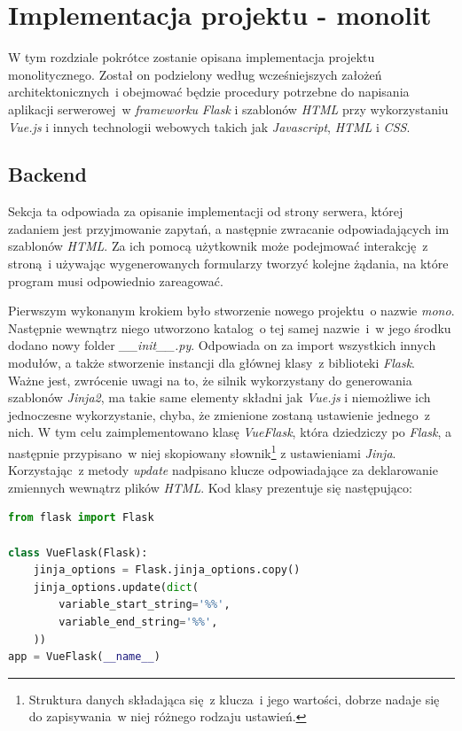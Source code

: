 \chapter{Implementacja projektu - monolit}
\label{roz4}
W tym rozdziale pokrótce zostanie opisana implementacja projektu monolitycznego. Został on podzielony według wcześniejszych założeń architektonicznych~i obejmować będzie procedury potrzebne do napisania aplikacji serwerowej~w \textit{frameworku} \textit{Flask} i szablonów \textit{HTML} przy wykorzystaniu \textit{Vue.js} i innych technologii webowych takich jak \textit{Javascript}, \textit{HTML} i \textit{CSS}.
\section{Backend}
Sekcja ta odpowiada za opisanie implementacji od strony serwera, której zadaniem jest przyjmowanie zapytań, a następnie zwracanie odpowiadających im szablonów \textit{HTML}. Za ich pomocą użytkownik może podejmować interakcję~z stroną~i używając wygenerowanych formularzy tworzyć kolejne żądania, na które program musi odpowiednio zareagować.

Pierwszym wykonanym krokiem było stworzenie nowego projektu~o nazwie \textit{mono}. Następnie wewnątrz niego utworzono katalog~o tej samej nazwie~i~w jego środku dodano nowy folder \textit{\_\_init\_\_.py}. Odpowiada on za import wszystkich innych modułów, a także stworzenie instancji dla głównej klasy~z biblioteki \textit{Flask}\cite{flask}. Ważne jest, zwrócenie uwagi na to, że silnik wykorzystany do generowania szablonów \textit{Jinja2}, ma takie same elementy składni jak \textit{Vue.js} i niemożliwe ich jednoczesne wykorzystanie, chyba, że zmienione zostaną ustawienie jednego~z nich\cite{vuejs, flask}. W tym celu zaimplementowano klasę \textit{VueFlask}, która dziedziczy po \textit{Flask}, a następnie przypisano~w niej skopiowany słownik\footnote{Struktura danych składająca się~z klucza~i jego wartości\cite{python}, dobrze nadaje się do zapisywania~w niej różnego rodzaju ustawień.} z ustawieniami \textit{Jinja}. Korzystając~z metody \textit{update}\cite{python} nadpisano klucze odpowiadające za deklarowanie zmiennych wewnątrz plików \textit{HTML}. Kod klasy prezentuje się następująco:

\newpage
\begin{lstlisting}[language=Python, caption={Zmiana opcji silnika \textit{Jinja2} poprzez nadpisanie klasy \textit{Flask}.}]
from flask import Flask

class VueFlask(Flask):
    jinja_options = Flask.jinja_options.copy()
    jinja_options.update(dict(
        variable_start_string='%%',
        variable_end_string='%%',
    ))
app = VueFlask(__name__)
\end{lstlisting}

